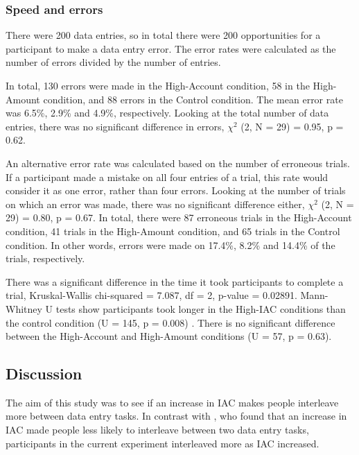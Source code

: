 \begin{table}
\begin{itemize}
\subsubsection{Speed and errors}
There were 200 data entries, so in total there were 200 opportunities for a participant to make a data entry error. The error rates were calculated as the number of errors divided by the number of entries. 

In total, 130 errors were made in the High-Account condition, 58 in the High-Amount condition, and 88 errors in the Control condition. The mean error rate was 6.5\%, 2.9\% and 4.9\%, respectively. 
Looking at the total number of data entries, there was no significant difference in errors, $\chi^2$ (2, N = 29) =  0.95, p = 0.62.

An alternative error rate was calculated based on the number of erroneous trials. If a participant made a mistake on all four entries of a trial, this rate would consider it as one error, rather than four errors. Looking at the number of trials on which an error was made, there was no significant difference either, $\chi^2$ (2, N = 29) =  0.80, p = 0.67. In total, there were 87 erroneous trials in the High-Account condition, 41 trials in the High-Amount condition, and 65 trials in the Control condition. In other words, errors were made on 17.4\%, 8.2\% and 14.4\% of the trials, respectively. 

There was a significant difference in the time it took participants to complete a trial, Kruskal-Wallis chi-squared = 7.087, df = 2, p-value = 0.02891. Mann-Whitney U tests show participants took longer in the High-IAC conditions than the control condition  (U = 145, p = 0.008) . There is no significant difference between the High-Account and High-Amount conditions (U = 57, p = 0.63).

\subsection{Discussion}
The aim of this study was to see if an increase in IAC makes people interleave more between data entry tasks. In contrast with \citet{Back2012}, who found that an increase in IAC made people less likely to interleave between two data entry tasks, participants in the current experiment interleaved more as IAC increased.


\end{itemize}
\end{table}
